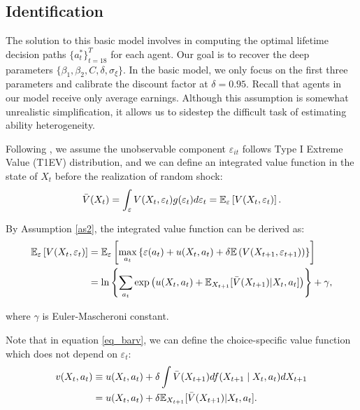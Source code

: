 \documentclass[a4paper, 12pt]{article}
\begin{document}
\subsection{Identification}
The solution to this basic model involves in computing the optimal lifetime decision paths $\{a_t^*\}^T_{t=18}$ for each agent.
Our goal is to recover the deep parameters $\{\beta_1, \beta_2, C, \delta, \sigma_{\xi} \}.$
In the basic model, we only focus on the first three parameters and calibrate the discount factor at $\delta = 0.95$. 
Recall that agents in our model receive only average earnings. 
Although this assumption is somewhat unrealistic simplification, 
it allows us to sidestep the difficult task of estimating ability heterogeneity.

Following \cite{rust1987optimal}, we assume the unobservable component $\varepsilon_{it}$ follows Type I Extreme Value (T1EV) distribution, 
and we can define an integrated value function in the state of $X_{t}$ before the realization of random shock:
\begin{equation}
\Bar{V}(X_t) = \int_\varepsilon V(X_t,\varepsilon_t)g(\varepsilon_t) d\varepsilon_t = \mathbb{E}_\varepsilon \left[ V(X_t, \varepsilon_t) \right] .
\end{equation}

By Assumption \eqref{as2}, the integrated value function can be derived as:
\begin{equation}
\label{eq_barv}
\begin{split}
\mathbb{E}_\varepsilon \left[ V(X_t, \varepsilon_t) \right] &= \mathbb{E}_\varepsilon \left[ \max_{a_t} \left\{ \varepsilon(a_t) + u(X_t, a_t) + \delta \mathbb{E}\left(V(X_{t+1}, \varepsilon_{t+1}) \right)\right\} \right]\\
&= \ln \left\{ \sum_{a_t} \exp \left( u(X_t, a_t) +\mathbb{E}_{X_{t+1}} [\Bar{V}(X_{t+1})|X_{t}, a_t] \right) \right\} + \gamma,
\end{split}
\end{equation}

where $\gamma$ is Euler-Mascheroni constant.

Note that in equation \eqref{eq_barv}, we can define the choice-specific value function which does not depend on $\varepsilon_t$:
\begin{equation}
\begin{split}
v(X_{t}, a_t) &\equiv u(X_t, a_t) + \delta\int \Bar{V}(X_{t+1}) df(X_{t+1} \mid X_{t}, a_t)dX_{t+1}\\
&= u(X_{t}, a_{t}) + \delta \mathbb{E}_{X_{t+1}} [\Bar{V}(X_{t+1})|X_{t}, a_t].
\end{split}
\end{equation}
\end{document}

